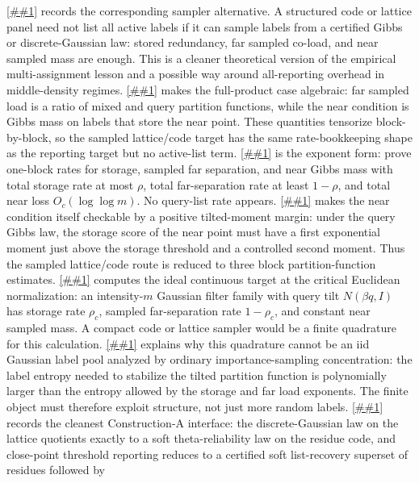 \documentclass[10pt]{article}
\newcommand{\Cref}[1]{\ref{##1}}
\theoremstyle{definition}
\begin{document}
\Cref{prop:sampled-structured-panel} records the corresponding sampler
alternative.  A structured code or lattice panel need not list all active
labels if it can sample labels from a certified Gibbs or discrete-Gaussian law:
stored redundancy, far sampled co-load, and near sampled mass are enough.  This
is a cleaner theoretical version of the empirical multi-assignment lesson and
a possible way around all-reporting overhead in middle-density regimes.
\Cref{cor:gibbs-sampled-product-panel} makes the full-product case algebraic:
far sampled load is a ratio of mixed and query partition functions, while the
near condition is Gibbs mass on labels that store the near point.  These
quantities tensorize block-by-block, so the sampled lattice/code target has the
same rate-bookkeeping shape as the reporting target but no active-list term.
\Cref{cor:gibbs-sampled-rate-bookkeeping} is the exponent form: prove one-block
rates for storage, sampled far separation, and near Gibbs mass with total
storage rate at most \(\rho\), total far-separation rate at least \(1-\rho\),
and total near loss \(O_c(\log\log m)\).  No query-list rate appears.
\Cref{lem:gibbs-near-moment-lower-bound} makes the near condition itself
checkable by a positive tilted-moment margin: under the query Gibbs law, the
storage score of the near point must have a first exponential moment just above
the storage threshold and a controlled second moment.  Thus the sampled
lattice/code route is reduced to three block partition-function estimates.
\Cref{lem:critical-tilted-gaussian-sampled-spectrum} computes the ideal
continuous target at the critical Euclidean normalization: an intensity-\(m\)
Gaussian filter family with query tilt \(N(\beta q,I)\) has storage rate
\(\rho_c\), sampled far-separation rate \(1-\rho_c\), and constant near sampled
mass.  A compact code or lattice sampler would be a finite quadrature for this
calculation.
\Cref{lem:naive-gaussian-quadrature-barrier} explains why this quadrature
cannot be an iid Gaussian label pool analyzed by ordinary importance-sampling
concentration: the label entropy needed to stabilize the tilted partition
function is polynomially larger than the entropy allowed by the storage and far
load exponents.  The finite object must therefore exploit structure, not just
more random labels.
\Cref{lem:construction-a-theta-quotient} records the cleanest Construction-A
interface: the discrete-Gaussian law on the lattice quotients exactly to a soft
theta-reliability law on the residue code, and close-point threshold reporting
reduces to a certified soft list-recovery superset of residues followed by
\end{document}
